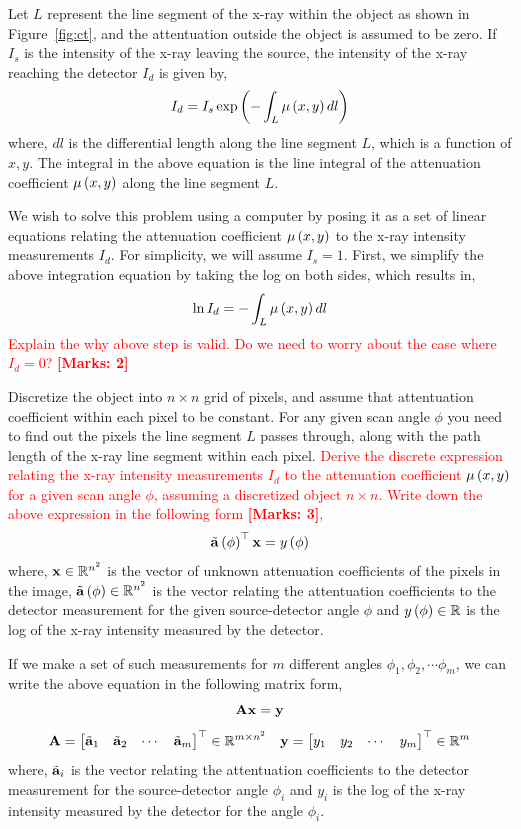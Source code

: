 \documentclass[12pt]{article}
\def\mf{\ensuremath\mathbf}
\def\mb{\ensuremath\mathbb}
\def\lp{\ensuremath\left(}
\def\rp{\ensuremath\right)}
\def\emx{\ensuremath\end{bmatrix*}}
\def\bmxc{\ensuremath\begin{bmatrix*}[c]}
\newcommand{\ct}[1]{\lp #1\rp}
\begin{document}
\begin{enumerate}
Let $L$ represent the line segment of the x-ray within the object as shown in Figure~\ref{fig:ct}, and the attentuation outside the object is assumed to be zero. If $I_s$ is the intensity of the x-ray leaving the source, the intensity of the x-ray reaching the detector $I_d$ is given by,
\[ I_d = I_s \exp\lp - \int_L \mu \ct{x, y} dl \rp \]
where, $dl$ is the differential length along the line segment $L$, which is a function of $x, y$. The integral in the above equation is the line integral of the attenuation coefficient $\mu\ct{x,y}$ along the line segment $L$.

We wish to solve this problem using a computer by posing it as a set of linear equations relating the attenuation coefficient $\mu\ct{x,y}$ to the x-ray intensity measurements $I_d$. For simplicity, we will assume $I_s = 1$. First, we simplify the above integration equation by taking the log on both sides, which results in,
\[ \ln I_d = - \int_L \mu \ct{x, y} dl \]
\textcolor{red}{Explain the why above step is valid. Do we need to worry about the case where $I_d = 0$? \textbf{[Marks: 2]}}

Discretize the object into $n \times n$ grid of pixels, and assume that attentuation coefficient within each pixel to be constant. For any given scan angle $\phi$ you need to find out the pixels the line segment $L$ passes through, along with the path length of the x-ray line segment within each pixel. \textcolor{red}{Derive the discrete expression relating the x-ray intensity measurements $I_d$ to the attenuation coefficient $\mu\ct{x,y}$ for a given scan angle $\phi$, assuming a discretized object $n \times n$. Write down the above expression in the following form \textbf{[Marks: 3]},
\[ \tilde{\mf{a}}\ct{\phi}^\top \mf{x} = y\ct{\phi} \]}
where, $\mf{x} \in \mb{R}^{n^2}$ is the vector of unknown attenuation coefficients of the pixels in the image, $\tilde{\mf{a}}\ct{\phi} \in \mb{R}^{n^2}$ is the vector relating the attentuation coefficients to the detector measurement for the given source-detector angle $\phi$ and $y\ct{\phi} \in \mb{R}$ is the log of the x-ray intensity measured by the detector. 

If we make a set of such measurements for $m$ different angles $\phi_1, \phi_2, \cdots \phi_m$, we can write the above equation in the following matrix form,
\[ \mf{A}\mf{x} = \mf{y} \]
\[ \mf{A} = \bmxc \tilde{\mf{a}}_1 & \tilde{\mf{a}}_2 & \cdots & \tilde{\mf{a}}_m\emx^\top \in \mb{R}^{m \times n^2}\quad \mf{y} = \bmxc y_1 & y_2 & \cdots & y_m\emx^\top \in \mb{R}^{m} \]
where, $\tilde{\mf{a}}_i$ is the vector relating the attentuation coefficients to the detector measurement for the source-detector angle $\phi_i$ and $y_i$ is the log of the x-ray intensity measured by the detector for the angle $\phi_i$.


\end{enumerate}
\end{document}
